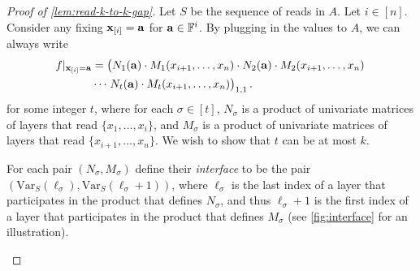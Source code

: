\documentclass[11pt]{article}
\newcommand{\var}[2]{\mathrm{Var}_{#1}({#2})}
\newcommand{\exi}{\vecx_{[i]}}
\begin{document}
\begin{proof}[Proof of \autoref{lem:read-k-to-k-gap}]
Let $S$ be the sequence of reads in $A$. Let $i \in [n]$. Consider any fixing $\exi = \veca$ for $\veca \in \F^i$. By plugging in the values to $A$, we can always write
\begin{align}
\label{eq:t-gap}
f|_{\exi = \veca} &= \left( \vphantom{M^{1,1}} N_1(\veca) \cdot M_1(x_{i+1},\ldots,x_n) \cdot N_2(\veca) \cdot M_2(x_{i+1},\ldots, x_n)\right. \nonumber\\
&\cdots \left. \vphantom{M^{1,1}}  N_t(\veca) \cdot  M_{t}(x_{i+1},\ldots,x_n) \right)_{1,1}.
\end{align}
for some integer $t$, where for each $\sigma \in [t]$, $N_\sigma$ is a product of univariate matrices of layers that read $\{x_1, \ldots, x_i\}$, and $M_\sigma$ is a product of univariate matrices of layers that read $\{x_{i+1}, \ldots, x_n\}$. We wish to show that $t$ can be at most $k$.

For each pair $(N_\sigma, M_\sigma)$ define their {\em interface} to be the pair $(\var{S}{\ell_\sigma}, \var{S}{\ell_\sigma+1})$, where $\ell_\sigma$ is the last index of a layer that participates in the product that defines $N_\sigma$, and thus $\ell_\sigma+1$ is the first index of a layer that participates in the product that defines $M_\sigma$ (see \autoref{fig:interface} for an illustration).


\begin{figure}[h]
\begin{center}
\end{center}
\end{figure}
\end{proof}
\end{document}
